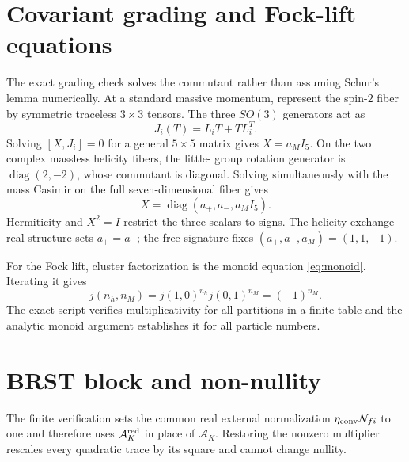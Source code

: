 \documentclass[11pt]{article}
\theoremstyle{definition}
\theoremstyle{remark}
\newcommand{\AK}{\mathcal A_K}
\newcommand{\AKred}{\mathcal A_K^{\rm red}}
\begin{document}
\section{Covariant grading and Fock-lift equations}
\label{app:grading}

The exact grading check solves the commutant rather than assuming
Schur's lemma numerically.
At a standard massive momentum, represent the spin-$2$ fiber by symmetric
traceless $3\times3$ tensors.  The three $SO(3)$ generators act as
\begin{equation}
J_i(T)=L_iT+TL_i^T.
\end{equation}
Solving $[X,J_i]=0$ for a general $5\times5$ matrix gives
$X=a_MI_5$.  On the two complex massless helicity fibers, the little-
group rotation generator is $\operatorname{diag}(2,-2)$, whose
commutant is diagonal.  Solving simultaneously with the mass Casimir on
the full seven-dimensional fiber gives
\begin{equation}
X=\operatorname{diag}(a_+,a_-,a_MI_5).
\end{equation}
Hermiticity and $X^2=I$ restrict the three scalars to signs.  The
helicity-exchange real structure sets $a_+=a_-$; the free signature fixes
$(a_+,a_-,a_M)=(1,1,-1)$.

For the Fock lift, cluster factorization is the monoid equation
\eqref{eq:monoid}.  Iterating it gives
\begin{equation}
j(n_h,n_M)=j(1,0)^{n_h}j(0,1)^{n_M}=(-1)^{n_M}.
\end{equation}
The exact script verifies multiplicativity for all partitions in a
finite table and the analytic monoid argument establishes it for all
particle numbers.

\section{BRST block and non-nullity}
\label{app:brst}

The finite verification sets the common real external normalization
$\eta_{\rm conv}\mathcal N_{fi}$ to one and therefore uses $\AKred$ in
place of $\AK$.  Restoring the nonzero multiplier rescales every
quadratic trace by its square and cannot change nullity.
\end{document}
